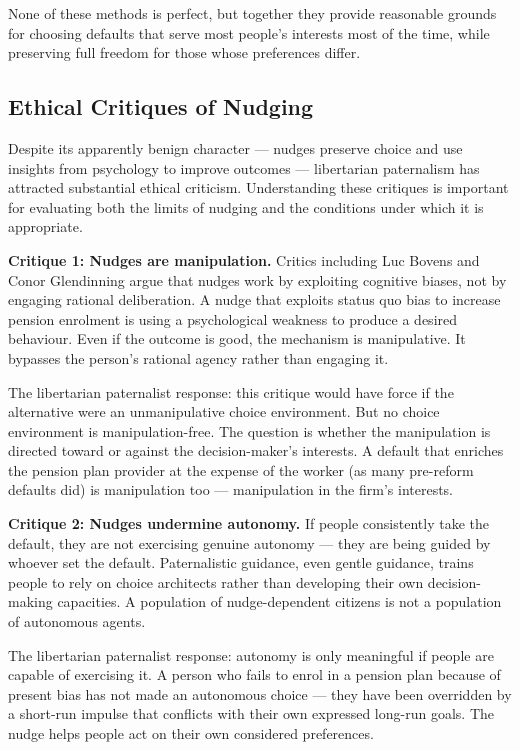 \documentclass[12pt, letterpaper]{article}
\begin{document}
None of these methods is perfect, but together they provide reasonable grounds for choosing defaults that serve most people's interests most of the time, while preserving full freedom for those whose preferences differ.


\subsection{Ethical Critiques of Nudging}


Despite its apparently benign character --- nudges preserve choice and use insights from psychology to improve outcomes --- libertarian paternalism has attracted substantial ethical criticism. Understanding these critiques is important for evaluating both the limits of nudging and the conditions under which it is appropriate.

\textbf{Critique 1: Nudges are manipulation.} Critics including Luc Bovens and Conor Glendinning argue that nudges work by exploiting cognitive biases, not by engaging rational deliberation. A nudge that exploits status quo bias to increase pension enrolment is using a psychological weakness to produce a desired behaviour. Even if the outcome is good, the mechanism is manipulative. It bypasses the person's rational agency rather than engaging it.

The libertarian paternalist response: this critique would have force if the alternative were an unmanipulative choice environment. But no choice environment is manipulation-free. The question is whether the manipulation is directed toward or against the decision-maker's interests. A default that enriches the pension plan provider at the expense of the worker (as many pre-reform defaults did) is manipulation too --- manipulation in the firm's interests.

\textbf{Critique 2: Nudges undermine autonomy.} If people consistently take the default, they are not exercising genuine autonomy --- they are being guided by whoever set the default. Paternalistic guidance, even gentle guidance, trains people to rely on choice architects rather than developing their own decision-making capacities. A population of nudge-dependent citizens is not a population of autonomous agents.

The libertarian paternalist response: autonomy is only meaningful if people are capable of exercising it. A person who fails to enrol in a pension plan because of present bias has not made an autonomous choice --- they have been overridden by a short-run impulse that conflicts with their own expressed long-run goals. The nudge helps people act on their own considered preferences.
\end{document}
